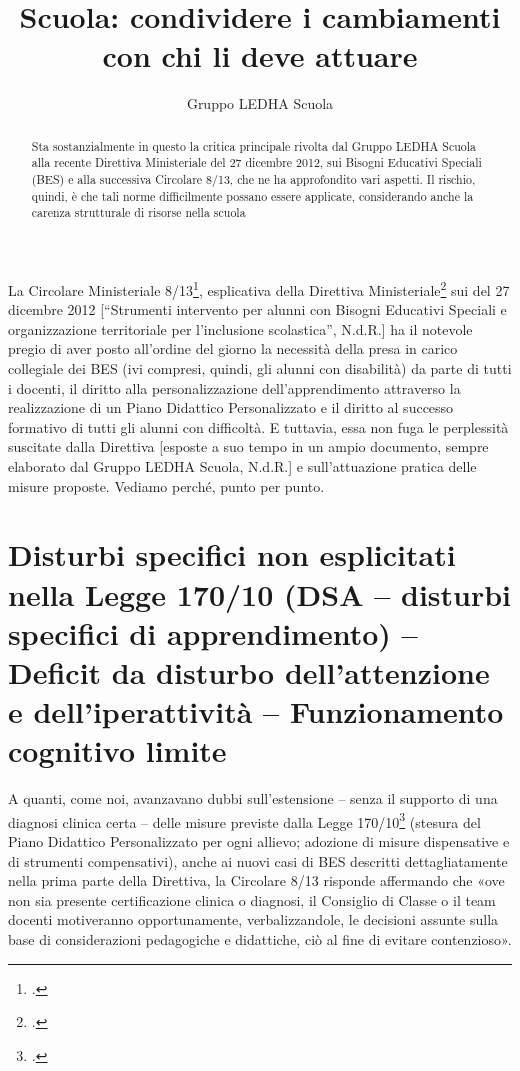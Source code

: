 \author{Gruppo LEDHA Scuola}
\title{Scuola: condividere i cambiamenti con chi li deve attuare}
\label{cha:ledha040413}
\begin{abstract}
Sta sostanzialmente in questo la critica principale rivolta dal Gruppo LEDHA Scuola alla recente Direttiva Ministeriale del 27 dicembre 2012, sui Bisogni Educativi Speciali (BES) e alla successiva Circolare 8/13, che ne ha approfondito vari aspetti. Il rischio, quindi, è che tali norme difficilmente possano essere applicate, considerando anche la carenza strutturale di risorse nella scuola
\end{abstract}
\maketitle
{}
La Circolare Ministeriale 8/13\footcite{cm8_2013}, esplicativa della Direttiva Ministeriale\footcite{dir27Dic2012} sui  del 27 dicembre 2012 [“Strumenti intervento per alunni con Bisogni Educativi Speciali e organizzazione territoriale per l'inclusione scolastica”, N.d.R.] ha il notevole pregio di aver posto all'ordine del giorno la necessità della presa in carico collegiale dei BES (ivi compresi, quindi, gli alunni con disabilità) da parte di tutti i docenti, il diritto alla personalizzazione dell'apprendimento attraverso la realizzazione di un Piano Didattico Personalizzato e il diritto al successo formativo di tutti gli alunni con difficoltà. E tuttavia, essa non fuga le perplessità suscitate dalla Direttiva\pageref{cha:ledha110213} [esposte a suo tempo in un ampio documento, sempre elaborato dal Gruppo LEDHA Scuola, N.d.R.] e sull'attuazione pratica delle misure proposte. Vediamo perché, punto per punto.
\section*{ Disturbi specifici non esplicitati nella Legge 170/10 (DSA – disturbi specifici di apprendimento) – Deficit da disturbo dell'attenzione e dell'iperattività – Funzionamento cognitivo limite}
	A quanti, come noi, avanzavano dubbi sull'estensione – senza il supporto di una diagnosi clinica certa – delle misure previste dalla Legge 170/10\footcite{legge170} (stesura del Piano Didattico Personalizzato per ogni allievo; adozione di misure dispensative e di strumenti compensativi), anche ai nuovi casi di BES descritti dettagliatamente nella prima parte della Direttiva, la Circolare 8/13 risponde affermando che «ove non sia presente certificazione clinica o diagnosi, il Consiglio di Classe o il team docenti motiveranno opportunamente, verbalizzandole, le decisioni assunte sulla base di considerazioni pedagogiche e didattiche, ciò al fine di evitare contenzioso».


